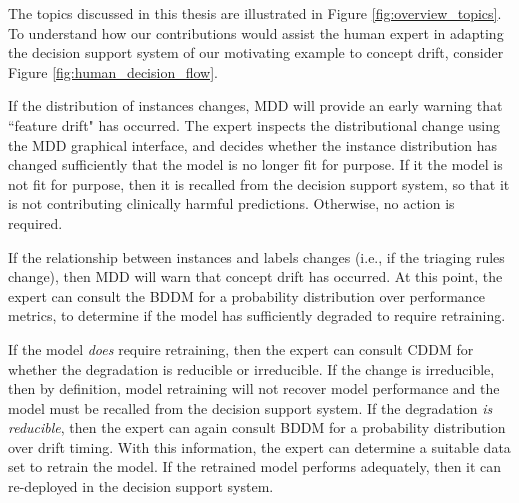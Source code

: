 The topics discussed in this thesis are illustrated in Figure \ref{fig:overview_topics}. To understand how our contributions would assist the human expert in adapting the decision support system of our motivating example to concept drift, consider Figure \ref{fig:human_decision_flow}. 

If the distribution of instances changes, MDD will provide an early warning that ``feature drift" has occurred. The expert inspects the distributional change using the MDD graphical interface, and decides whether the instance distribution has changed sufficiently that the model is no longer fit for purpose. If it the model is not fit for purpose, then it is recalled from the decision support system, so that it is not contributing clinically harmful predictions. Otherwise, no action is required.

If the relationship between instances and labels changes (i.e., if the triaging rules change), then MDD will warn that concept drift has occurred. At this point, the expert can consult the BDDM for a probability distribution over performance metrics, to determine if the model has sufficiently degraded to require retraining. 

If the model {\it does} require retraining, then the expert can consult CDDM for whether the degradation is reducible or irreducible. If the change is irreducible, then by definition, model retraining will not recover model performance and the model must be recalled from the decision support system. If the degradation {\it is reducible}, then the expert can again consult BDDM for a probability distribution over drift timing. With this information, the expert can determine a suitable data set to retrain the model. If the retrained model performs adequately, then it can re-deployed in the decision support system.

